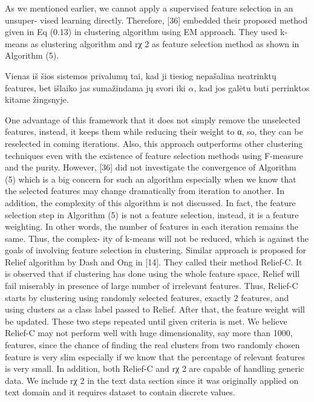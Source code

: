 \documentclass{VUMIFInfKursinis}
\begin{document}
As we mentioned earlier, we cannot apply a supervised feature selection in an unsuper- vised learning directly. Therefore, [36] embedded their proposed method given in Eq (0.13) in clustering algorithm using EM approach. They used k-means as clustering algorithm and rχ 2 as feature selection method as shown in Algorithm (5).

Vienas iš šios sistemos privalumų tai, kad ji tiesiog nepašalina neatrinktų features, bet išlaiko jas sumažindama jų svori iki $\alpha$, kad jos galėtu buti perrinktos kitame žingsnyje. 

One advantage of this framework that it does not simply remove the unselected features, instead, it keeps them while reducing their weight to α, so, they can be reselected in coming iterations. Also, this approach outperforms other clustering techniques even with the existence of feature selection methods using F-measure and the purity. However, [36] did not investigate the convergence of Algorithm (5) which is a big concern for such an algorithm especially when we know that the selected features may change dramatically from iteration to another. In addition, the complexity of this algorithm is not discussed. In fact, the feature selection step in Algorithm (5) is not a feature selection, instead, it is a feature weighting. In other words, the number of features in each iteration remains the same. Thus, the complex- ity of k-means will not be reduced, which is against the goals of involving feature selection in clustering.
Similar approach is proposed for Relief algorithm by Dash and Ong in [14]. They called their method Relief-C. It is observed that if clustering has done using the whole feature space, Relief will fail miserably in presence of large number of irrelevant features. Thus, Relief-C starts by clustering using randomly selected features, exactly 2 features, and using clusters as a class label passed to Relief. After that, the feature weight will be updated.  These two steps repeated until given criteria is met. We believe Relief-C may not perform well with huge dimensionality, say more than 1000, features, since the chance of finding the real clusters from two randomly chosen feature is very slim especially if we know that the percentage of relevant features is very small. In addition, both Relief-C and rχ 2 are capable of handling generic data. We include rχ 2 in the text data section since it was originally applied on text domain and it requires dataset to contain discrete values.
\end{document}
